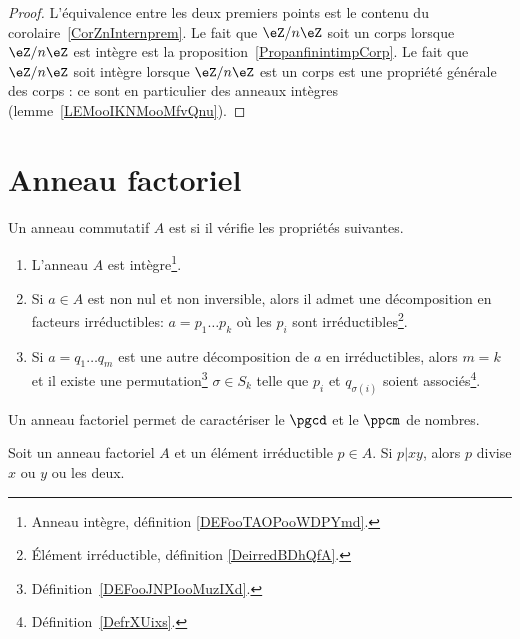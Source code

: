 \begin{proof}
	L'équivalence entre les deux premiers points est le contenu du corolaire~\ref{CorZnInternprem}. Le fait que \( \eZ/n\eZ\) soit un corps lorsque \( \eZ/n\eZ\) est intègre est la proposition~\ref{PropanfinintimpCorp}. Le fait que \( \eZ/n\eZ\) soit intègre lorsque \( \eZ/n\eZ\) est un corps est une propriété générale des corps : ce sont en particulier des anneaux intègres (lemme~\ref{LEMooIKNMooMfvQnu}).
\end{proof}



\section{Anneau factoriel}

\begin{definition}        \label{DEFooVCATooPJGWKq}
	Un anneau commutatif \( A\) est  si il vérifie les propriétés suivantes.
	\begin{enumerate}
		\item
		      L'anneau \( A\) est intègre\footnote{Anneau intègre, définition \ref{DEFooTAOPooWDPYmd}.}.
		\item
		      Si \( a\in A\) est non nul et non inversible, alors il admet une décomposition en facteurs irréductibles: \( a=p_1\ldots p_k\) où les \( p_i\) sont irréductibles\footnote{Élément irréductible, définition \ref{DeirredBDhQfA}.}.
		\item		\label{ITEMooKVDBooTASwVO}
		      Si \( a=q_1\ldots q_m\) est une autre décomposition de \( a\) en irréductibles, alors \( m=k\) et il existe une permutation\footnote{Définition~\ref{DEFooJNPIooMuzIXd}.} \( \sigma\in S_k\) telle que \( p_i\) et \( q_{\sigma(i)}\) soient associés\footnote{Définition~\ref{DefrXUixs}.}.
	\end{enumerate}
\end{definition}

Un anneau factoriel permet de caractériser le \( \pgcd\) et le \( \ppcm\) de nombres.

\begin{lemma}		\label{LEMooLVKMooSLuzao}
	Soit un anneau factoriel \( A\) et un élément irréductible \( p\in A\). Si \( p|xy\), alors \( p\) divise \( x\) ou \( y\) ou les deux.
\end{lemma}

